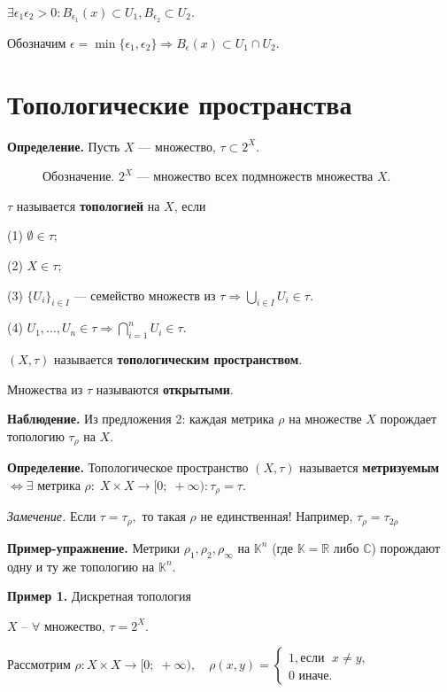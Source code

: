 \documentclass[12pt,a4paper]{article}
\begin{document}
$\exists \epsilon_1 \epsilon_2 > 0: B_{\epsilon_1}(x) \subset U_1, B_{\epsilon_2} \subset U_2.$

Обозначим $\epsilon = \min\{\epsilon_1, \epsilon_2\} \Rightarrow B_{\epsilon}(x) \subset  U_1 \cap U_2.$

\section{Топологические пространства}

\textbf{Определение.} Пусть $X$ --- множество, $\tau \subset 2^{X}.$

\begin{figure}
	Обозначение. $2^{X}$ --- множество всех подмножеств множества $X.$
\end{figure}

$\tau$ называется \textbf{топологией} на $X$, если

(1) $\emptyset \in \tau;$

(2) $X \in \tau;$

(3) $\{U_i\}_{i \in I}$ --- семейство множеств из $\tau \Rightarrow \bigcup_{i \in I} U_i \in \tau.$

(4) $U_1, \ldots, U_n \in \tau \Rightarrow \bigcap^n_{i = 1} U_i \in \tau.$

$\left(X, \tau \right)$ называется \textbf{топологическим пространством}.

Множества из $\tau$ называются \textbf{открытыми}.

\textbf{Наблюдение.} Из предложения 2: каждая метрика $\rho$ на множестве $X$ порождает топологию $\tau_{\rho}$ на $X.$

\textbf{Определение.} Топологическое пространство $(X, \tau)$ называется \textbf{метризуемым} $\Leftrightarrow \exists$ метрика $\rho: \; X\times X \to [0;\; +\infty): \tau_{\rho} = \tau.$

\textit{Замечение.} Если $\tau = \tau_{\rho},$ то такая $\rho$ не единственная! Например, $\tau_{\rho} = \tau_{2\rho}$

\textbf{Пример-упражнение.} Метрики $\rho_1, \rho_2, \rho_{\infty}$ на $\mathbb{K}^n$ (где $\mathbb{K} = \mathbb{R}$ либо $\mathbb{C}$) порождают одну и ту же топологию на $\mathbb{K}^n.$

\textbf{Пример 1.} Дискретная топология

$X$ -- $\forall$ множество, $\tau = 2^X.$

Рассмотрим $\rho: X \times X \to [0; \; +\infty), \quad \rho(x,y) = \begin{cases} 1, \text{если } \; x \neq y, \\ 0 \text{ иначе.} \end{cases}$
\end{document}
